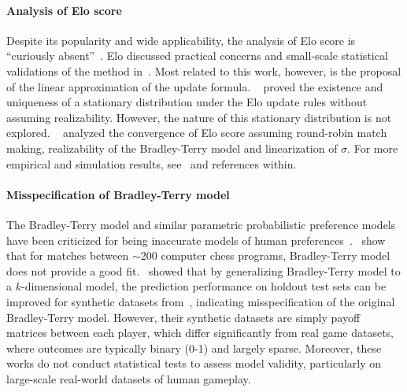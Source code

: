 
\paragraph{Analysis of Elo score} Despite its popularity and wide applicability, the analysis of Elo score is ``curiously absent''~\citep{aldous2017elo}.
Elo discussed practical concerns and small-scale statistical validations of the method in~\citet{elo1978rating}. Most related to this work, however, is the proposal of the linear approximation of the update formula.
~\citet{aldous2017elo} proved the existence and uniqueness of a stationary distribution under the Elo update rules without assuming realizability. However, the nature of this stationary distribution is not explored.
~\citet{de2024stochastic} analyzed the convergence of Elo score assuming round-robin match making, realizability of the Bradley-Terry model and linearization of $\sigma$.
For more empirical and simulation results, see~\citet{kiraly2017modelling} and references within.


\paragraph{Misspecification of Bradley-Terry model} The Bradley-Terry model and similar parametric probabilistic preference models have been criticized for being inaccurate models of human preferences~\citep{ballinger1997decisions}.~\citet{oliveira2018new} show that for matches between $\sim$200 computer chess programs, Bradley-Terry model does not provide a good fit.~\citet{bertrand2023limitations} showed that by generalizing Bradley-Terry model to a $k$-dimensional model, the prediction performance on holdout test sets can be improved for synthetic datasets from~\citet{czarnecki2020real}, indicating misspecification of the original Bradley-Terry model. However, their synthetic datasets are simply payoff matrices between each player,
which differ significantly from real game datasets, where outcomes are typically binary (0-1) and largely sparse. Moreover, these works do not conduct statistical tests to assess model validity, particularly on large-scale real-world datasets of human gameplay.


